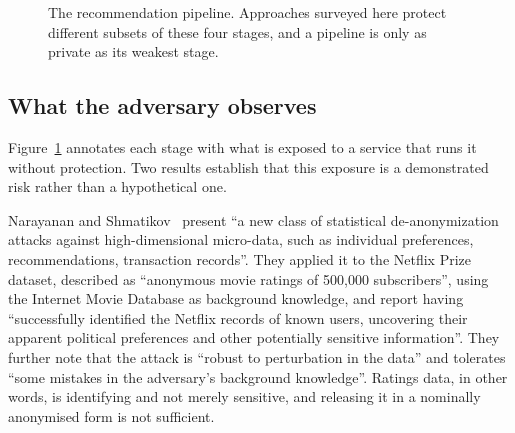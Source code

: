 \begin{figure}[t]
\centering
{}
\caption{The recommendation pipeline. Approaches surveyed here protect different subsets of these
         four stages, and a pipeline is only as private as its weakest stage.}
\label{fig:pipeline}
\end{figure}

\subsection{What the adversary observes}
\label{sec:background:adversary}

Figure~\ref{fig:pipeline} annotates each stage with what is exposed to a service that runs it
without protection. Two results establish that this exposure is a demonstrated risk rather than a
hypothetical one.

Narayanan and Shmatikov~\cite{narayanan2008} present ``a new class of statistical
de-anonymization attacks against high-dimensional micro-data, such as individual preferences,
recommendations, transaction records''. They applied it to the Netflix Prize dataset, described as
``anonymous movie ratings of 500,000 subscribers'', using the Internet Movie Database as background
knowledge, and report having ``successfully identified the Netflix records of known users,
uncovering their apparent political preferences and other potentially sensitive information''.
They further note that the attack is ``robust to perturbation in the data'' and tolerates ``some
mistakes in the adversary's background knowledge''. Ratings data, in other words, is identifying
and not merely sensitive, and releasing it in a nominally anonymised form is not sufficient.

